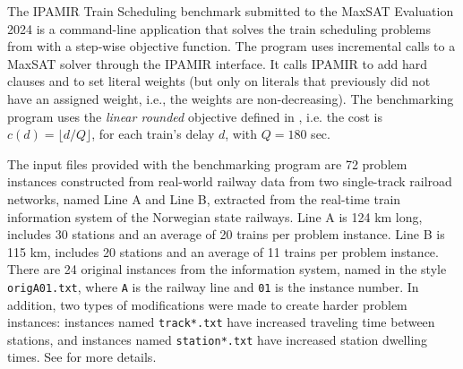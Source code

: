 \documentclass[conference]{IEEEtran}
\begin{document}
The IPAMIR Train Scheduling benchmark submitted to the MaxSAT Evaluation 2024
is a command-line application that solves the train scheduling problems from
\cite{croella2024maxsat} with a step-wise objective function.
The program uses incremental calls to a MaxSAT solver through the IPAMIR
interface.  It calls IPAMIR to add hard clauses and to set literal weights (but
only on literals that previously did not have an assigned weight, i.e., the
weights are
non-decreasing).
The benchmarking program uses the \emph{linear rounded} objective defined in 
\cite{croella2024maxsat}, i.e. the cost is $c(d) =  \lfloor d / Q \rfloor $,
for each train's delay $d$, with $Q=180$ sec.

The input files provided with the benchmarking program 
are 72 problem instances constructed from real-world railway data
from two single-track
railroad networks, named Line A and Line B, 
extracted from the real-time train information system of the Norwegian state railways. 
Line A is 124 km long, includes 30 stations and
an average of 20 trains per problem instance.
Line B is 115 km, includes 20 stations and an average of 11 trains per problem instance.
There are 24 original instances from the information system, 
named in the style \texttt{origA01.txt}, where \texttt{A} is the 
railway line and \texttt{01} is the instance number.
In addition, two types of modifications were made to create harder problem instances:
instances named \texttt{track*.txt} have increased traveling time between stations,
and instances named \texttt{station*.txt} have increased station dwelling times.
See \cite{croella2024maxsat} for more details.
 


\printbibliography
\end{document}
